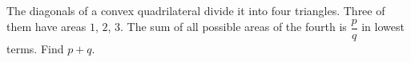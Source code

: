 The diagonals of a convex quadrilateral divide it into four triangles. Three of them have areas $1$, $2$, $3$. The sum of all possible areas of the fourth is $\dfrac pq$ in lowest terms. Find $p+q$.
